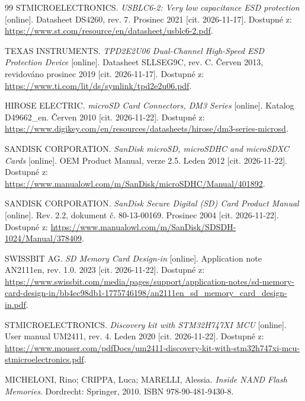 \begin{thebibliography}{99}
    STMICROELECTRONICS.
    \emph{USBLC6-2: Very low capacitance ESD protection}
    [online].
    Datasheet DS4260, rev. 7.
    Prosinec 2021 [cit. 2026-11-17].
    Dostupné z:
    \url{https://www.st.com/resource/en/datasheet/usblc6-2.pdf}.

    TEXAS INSTRUMENTS.
    \emph{TPD2E2U06 Dual-Channel High-Speed ESD
    Protection Device} [online].
    Datasheet SLLSEG9C, rev. C.
    Červen 2013, revidováno prosinec 2019
    [cit. 2026-11-17].
    Dostupné z:
    \url{https://www.ti.com/lit/ds/symlink/tpd2e2u06.pdf}.


    HIROSE ELECTRIC.
    \emph{microSD\texttrademark{} Card Connectors, DM3 Series} [online].
    Katalog D49662\_en.
    Červen 2010
    [cit. 2026-11-22].
    Dostupné z:
    \url{https://www.digikey.com/en/resources/datasheets/hirose/dm3-series-microsd}.

    SANDISK CORPORATION.
    \emph{SanDisk microSD, microSDHC and microSDXC Cards} [online].
    OEM Product Manual, verze 2.5.
    Leden 2012
    [cit. 2026-11-22].
    Dostupné z:
    \url{https://www.manualowl.com/m/SanDisk/microSDHC/Manual/401892}.

    SANDISK CORPORATION.
    \emph{SanDisk Secure Digital (SD) Card Product Manual} [online].
    Rev. 2.2, dokument č. 80-13-00169.
    Prosinec 2004
    [cit. 2026-11-22].
    Dostupné z:
    \url{https://www.manualowl.com/m/SanDisk/SDSDH-1024/Manual/378409}.

    SWISSBIT AG.
    \emph{SD Memory Card Design-in} [online].
    Application note AN2111en, rev. 1.0.
    2023
    [cit. 2026-11-22].
    Dostupné z:
    \url{https://www.swissbit.com/media/pages/support/application-notes/sd-memory-card-design-in/bb4ec98db1-1775746198/an2111en_sd_memory_card_design-in.pdf}.

    STMICROELECTRONICS.
    \emph{Discovery kit with STM32H747XI MCU} [online].
    User manual UM2411, rev. 4.
    Leden 2020
    [cit. 2026-11-22].
    Dostupné z:
    \url{https://www.mouser.com/pdfDocs/um2411-discovery-kit-with-stm32h747xi-mcu-stmicroelectronics.pdf}.

    MICHELONI, Rino; CRIPPA, Luca; MARELLI, Alessia.
    \emph{Inside NAND Flash Memories}.
    Dordrecht: Springer, 2010.
    ISBN 978-90-481-9430-8.



\end{thebibliography}
